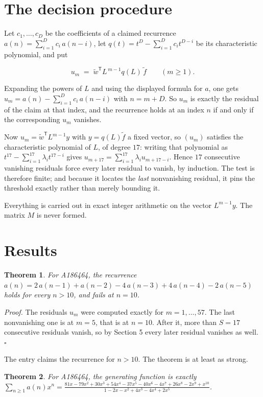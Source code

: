 \documentclass[11pt]{article}
\newtheorem{theorem}{Theorem}
\theoremstyle{definition}
\begin{document}
\section{The decision procedure}

Let $c_1,\dots,c_D$ be the coefficients of a claimed recurrence $a(n) = \sum_{i=1}^{D} c_i\,a(n-i)$, let $q(t) = t^{D} - \sum_{i=1}^{D} c_i t^{D-i}$ be its characteristic polynomial, and put

\[u_m \;=\; \tilde w^{\mathsf T} L^{\,m-1} q(L)\,\tilde f \qquad (m \ge 1).\]

Expanding the powers of $L$ and using the displayed formula for $a$, one gets $u_m = a(n) - \sum_{i=1}^{D} c_i\,a(n-i)$ with $n = m + D$. So $u_m$ is exactly the residual of the claim at that index, and the recurrence holds at an index $n$ if and only if the corresponding $u_m$ vanishes.

Now $u_m = \tilde w^{\mathsf T} L^{m-1} y$ with $y = q(L)\tilde f$ a fixed vector, so $(u_m)$ satisfies the characteristic polynomial of $L$, of degree $17$: writing that polynomial as $t^{17} - \sum_{i=1}^{17} \lambda_i t^{17-i}$ gives $u_{m+17} = \sum_{i=1}^{17} \lambda_i u_{m+17-i}$. Hence $17$ consecutive vanishing residuals force every later residual to vanish, by induction. The test is therefore finite; and because it locates the {\itshape last} nonvanishing residual, it pins the threshold exactly rather than merely bounding it.

Everything is carried out in exact integer arithmetic on the vector $L^{m-1}y$. The matrix $M$ is never formed.

\section{Results}

\begin{theorem} For A186464, the recurrence $a(n) = 2\,a(n-1) + a(n-2) - 4\,a(n-3) + 4\,a(n-4) - 2\,a(n-5)$ holds for every $n > 10$, and fails at $n = 10$.\end{theorem}

{\itshape Proof.} The residuals $u_m$ were computed exactly for $m = 1,\dots,57$. The last nonvanishing one is at $m = 5$, that is at $n = 10$. After it, more than $S = 17$ consecutive residuals vanish, so by Section 5 every later residual vanishes as well. $\square$

The entry claims the recurrence for $n > 10$. The theorem is at least as strong.

\begin{theorem} For A186464, the generating function is exactly $\sum_{n\ge 1} a(n)x^n = \frac{81x - 79x^{2} + 30x^{3} + 54x^{4} - 37x^{5} - 40x^{6} - 4x^{7} + 26x^{8} - 2x^{9} + x^{10}}{1 - 2x - x^{2} + 4x^{3} - 4x^{4} + 2x^{5}}$.\end{theorem}
\end{document}
